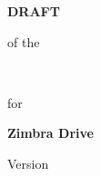 \begin{center}
\ifdefined\ISDRAFT
    \begin{Huge}
    \textbf{DRAFT}\\
    \end{Huge}
    of the\\
\fi
\begin{Huge}
\textbf{\documentTitle}\\
\end{Huge}
for\\
\begin{Huge}
\textbf{Zimbra Drive}\\
\end{Huge}
Version \version
\end{center}
